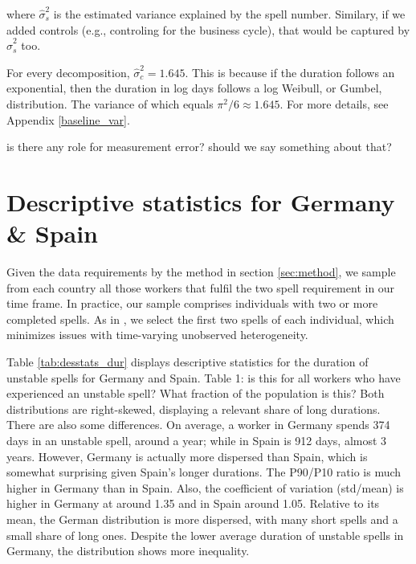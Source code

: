 \documentclass[12pt]{article}
\theoremstyle{definition}
\theoremstyle{remark}
\begin{document}
where $\hat{\sigma}^2_{s}$ is the estimated variance explained by the spell number. Similary, if we added controls (e.g., controling for the business cycle), that would be captured by $\hat{\sigma}^2_{s}$ too.


For every decomposition, $\hat{\sigma}^2_{c} = 1.645$. This is because if the duration follows an exponential, then the duration in log days follows a log Weibull, or Gumbel, distribution. The variance of which equals $\pi^2 / 6 \approx 1.645$.
For more details, see Appendix \ref{baseline_var}.




\textcolor{mygreen}{is there any role for measurement error? should we say something about that?}




\section{Descriptive statistics for Germany \& Spain} \label{sec: desc stats}

Given the data requirements by the method in section \ref{sec:method},  we sample from each country all those workers that fulfil the two spell requirement in our time frame. 
In practice,
our sample comprises individuals with two or more completed spells. As in \citet*{ABS}, we select the first two spells of each individual,  which minimizes issues with time-varying unobserved heterogeneity.

Table \ref{tab:desstats_dur} displays descriptive statistics for the duration of unstable spells for Germany and Spain. \textcolor{mygreen}{Table 1: is this for all workers who have experienced an unstable spell? What fraction of the population is this?}
Both distributions are right-skewed, displaying a relevant share of long durations. 
There are also some differences. 
On average, a worker in Germany spends 
374 days in an unstable spell, around a year; while in Spain is 912 days, almost 3 years. 
However, Germany is actually 
more dispersed than Spain, which is somewhat surprising given Spain's longer durations. 
The P90/P10 ratio is much higher in Germany than in Spain. Also, the coefficient of variation (std/mean) is higher in Germany at around 1.35 and in Spain around 1.05. 
Relative to its mean, the German distribution is more dispersed, 
with many short spells and a small share of  long ones. Despite the lower average  duration of unstable spells in Germany, the distribution shows more inequality. 
\end{document}
